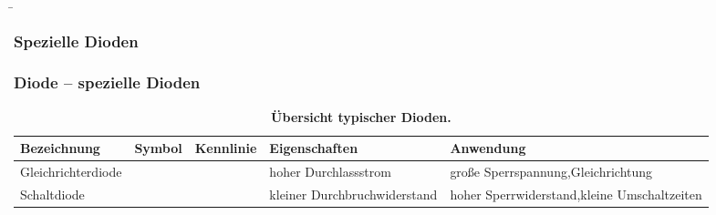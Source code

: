 \begin{frame}
    \b{
        \subsubsection{Spezielle Dioden}
        \frametitle{Diode -- spezielle Dioden}
        \begin{table}[H]
            \centering
            \begin{tabular}{ |p{2.1cm}|p{1.4cm}|p{3.2cm}|p{2.8cm}|p{3cm}| }
                \hline
                \textbf{Bezeichnung}         & \textbf{Symbol} & \textbf{Kennlinie} & \textbf{Eigenschaften} & \textbf{Anwendung} \\
                \hline
                Gleich\-richter\-diode
                                             &
                \begin{minipage}[t][2.6cm][c]{1.4cm}
                    \centering 
                \end{minipage}
                                             &
                \begin{minipage}[t][2.6cm][c]{3.3cm}
                    \centering 
                \end{minipage}
                                             &
                hoher Durchlassstrom         &
                große Sperrspannung,\newline Gleichrichtung                                                                       \\
                \hline
                Schalt\-diode
                                             &
                \begin{minipage}[t][2.6cm][c]{1.4cm}
                    \centering 
                \end{minipage}
                                             &
                \begin{minipage}[t][2.6cm][c]{3.3cm}
                    \centering 
                \end{minipage}
                                             &
                kleiner Durchbruchwiderstand &
                hoher Sperrwiderstand,\newline kleine Umschaltzeiten                                                              \\
                \hline
            \end{tabular}
            \caption{\textbf{Übersicht typischer Dioden.}}
        \end{table}
    }
\end{frame}

